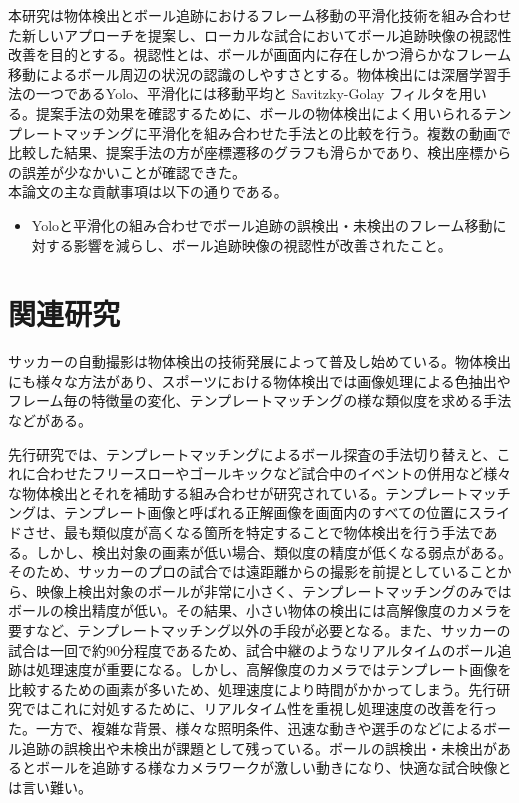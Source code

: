 \documentclass[11pt,a4j]{jreport}
\begin{document}
本研究は物体検出とボール追跡におけるフレーム移動の平滑化技術を組み合わせた新しいアプローチを提案し、ローカルな試合においてボール追跡映像の視認性改善を目的とする。視認性とは、ボールが画面内に存在しかつ滑らかなフレーム移動によるボール周辺の状況の認識のしやすさとする。物体検出には深層学習手法の一つであるYolo、平滑化には移動平均と Savitzky-Golay フィルタを用いる。提案手法の効果を確認するために、ボールの物体検出によく用いられるテンプレートマッチングに平滑化を組み合わせた手法との比較を行う。複数の動画で比較した結果、提案手法の方が座標遷移のグラフも滑らかであり、検出座標からの誤差が少なかいことが確認できた。\\

\noindent
本論文の主な貢献事項は以下の通りである。
\begin{itemize}
    \item Yoloと平滑化の組み合わせでボール追跡の誤検出・未検出のフレーム移動に対する影響を減らし、ボール追跡映像の視認性が改善されたこと。
\end{itemize}

\chapter{関連研究}

サッカーの自動撮影は物体検出の技術発展によって普及し始めている。物体検出にも様々な方法があり、スポーツにおける物体検出では画像処理による色抽出やフレーム毎の特徴量の変化\cite{携帯}、テンプレートマッチングの様な類似度を求める手法\cite{切り替えシステム}などがある。

\noindent
先行研究では、テンプレートマッチングによるボール探査の手法切り替え\cite{切り替えシステム}と、これに合わせたフリースローやゴールキックなど試合中のイベントの併用など様々な物体検出とそれを補助する組み合わせが研究されている。テンプレートマッチングは、テンプレート画像と呼ばれる正解画像を画面内のすべての位置にスライドさせ、最も類似度が高くなる箇所を特定することで物体検出を行う手法である。しかし、検出対象の画素が低い場合、類似度の精度が低くなる弱点がある。\cite{高解像度}そのため、サッカーのプロの試合では遠距離からの撮影を前提としていることから、映像上検出対象のボールが非常に小さく、テンプレートマッチングのみではボールの検出精度が低い。その結果、小さい物体の検出には高解像度のカメラを要すなど、テンプレートマッチング以外の手段が必要となる。また、サッカーの試合は一回で約90分程度であるため、試合中継のようなリアルタイムのボール追跡は処理速度が重要になる。しかし、高解像度のカメラではテンプレート画像を比較するための画素が多いため、処理速度により時間がかかってしまう。先行研究ではこれに対処するために、リアルタイム性を重視し処理速度の改善を行った。一方で、複雑な背景、様々な照明条件、迅速な動きや選手のなどによるボール追跡の誤検出や未検出が課題として残っている。ボールの誤検出・未検出があるとボールを追跡する様なカメラワークが激しい動きになり、快適な試合映像とは言い難い。
\end{document}
